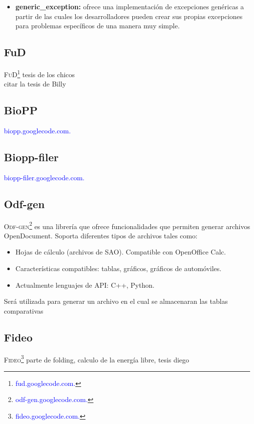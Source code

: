 \documentclass[12pt,a4paper,spanish]{article}
\begin{document}
\begin{itemize}
			\item \textbf{generic\_exception:} ofrece una implementación de excepciones genéricas a partir de las cuales los desarrolladores pueden crear 												sus propias excepciones para problemas específicos de una manera muy simple.
		\end{itemize}
		

	\subsection{FuD}
		\textsc{FuD}\footnote{\textcolor{blue}{fud.googlecode.com.}} tesis de los chicos
		 	\\
			citar la tesis de Billy

	\subsection{BioPP}
		 \textcolor{blue}{biopp.googlecode.com.}

	\subsection{Biopp-filer}
		 \textcolor{blue}{biopp-filer.googlecode.com.}

	\subsection{Odf-gen}
		\textsc{Odf-gen}\footnote{\textcolor{blue}{odf-gen.googlecode.com.}} es una librería que ofrece funcionalidades que permiten generar archivos 			OpenDocument. Soporta diferentes tipos de archivos tales como:
		\begin{itemize}
			\item Hojas de cálculo (archivos de SAO). Compatible con OpenOffice Calc.
			\item Características compatibles: tablas, gráficos, gráficos de automóviles.
			\item Actualmente lenguajes de API: C++, Python.
		\end{itemize}

		 Será utilizada para generar un archivo en el cual se almacenaran las tablas comparativas	
		 
	\subsection{Fideo}
			\textsc{Fideo}\footnote{\textcolor{blue}{fideo.googlecode.com.}} parte de folding, calculo de la energía libre, tesis diego
 
\end{document}
